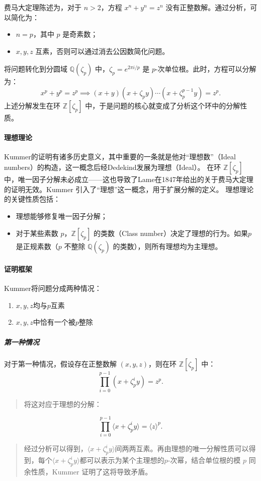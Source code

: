 \documentclass{article}
\begin{document}
\noindent
费马大定理陈述为，对于 $n > 2$，方程 $x^n + y^n = z^n$ 没有正整数解。通过分析，可以简化为：
\begin{itemize}
    \item $n=p$，其中 $p$ 是奇素数；
    \item $x,y,z$ 互素，否则可以通过消去公因数简化问题。
\end{itemize}

\noindent
将问题转化到分圆域 $\mathbb{Q}(\zeta_p)$ 中，$\zeta_p = e^{2\pi i / p}$ 是 $p$-次单位根。此时，方程可以分解为：
$$
x^p + y^p = z^p \implies (x+y)(x+\zeta_p y)\cdots(x+\zeta_p^{p-1}y) = z^p.
$$
上述分解发生在环 $\mathbb{Z}[\zeta_p]$ 中，于是问题的核心就变成了分析这个环中的分解性质。

\paragraph{理想理论}
Kummer的证明有诸多历史意义，其中重要的一条就是他对“理想数”（Ideal numbers）的构造，这一概念后经Dedekind发展为理想（Ideal）。
在环 $\mathbb{Z}[\zeta_p]$ 中，唯一因子分解未必成立——这也导致了Lame在1847年给出的关于费马大定理的证明无效。Kummer 引入了“理想”这一概念，用于扩展分解的定义。
理想理论的关键性质包括：
\begin{itemize}
    \item 理想能够修复唯一因子分解；
    \item 对于某些素数 $p$，$\mathbb{Z}[\zeta_p]$ 的类数（Class number）决定了理想的行为。如果$p$是正规素数（$p$ 不整除 $\mathbb{Q}(\zeta_p)$ 的类数），则所有理想均为主理想。
\end{itemize}

\paragraph{证明框架}
Kummer将问题分成两种情况：
\begin{enumerate}
\item $x,y,z$均与$p$互素
\item $x,y,z$中恰有一个被$p$整除
\end{enumerate}
\subparagraph{第一种情况}
对于第一种情况，假设存在正整数解 $(x,y,z)$，则在环 $\mathbb{Z}[\zeta_p]$ 中：
$$
\prod_{i=0}^{p-1}(x+\zeta_p^iy) = z^p.
$$
\begin{quote}
将这对应于理想的分解：
\end{quote}
$$
\prod_{i=0}^{p-1}\langle x+\zeta_p^iy\rangle = \langle z\rangle^p.
$$
\begin{quote}
经过分析可以得到，$\langle x+\zeta_p^iy\rangle$间两两互素。再由理想的唯一分解性质可以得到，每个$\langle x+\zeta_p^iy\rangle$都可以表示为某个主理想的$p$-次幂，结合单位根的模 $p$ 同余性质，Kummer 证明了这将导致矛盾。
\end{quote}
\end{document}
